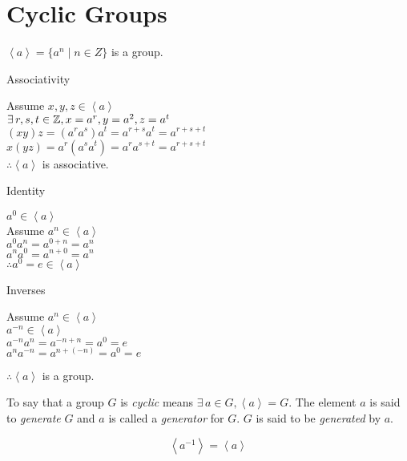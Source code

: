 \documentclass[letterpaper,12pt,fleqn]{article}
\newcommand{\cycle}[1]{\left<#1\right>}
\begin{document}
\section*{Cyclic Groups}

\begin{theorem}
$\cycle{a}=\{a^n\mid n\in Z\}$ is a group.
\end{theorem}

\begin{theproof}
  \listbreak
  \begin{description}
  \item{Associativity}

    Assume $x,y,z\in\cycle{a}$ \\
    $\exists\,r,s,t\in\mathbb{Z},x=a^r,y=a^2,z=a^t$ \\
    $(xy)z=(a^ra^s)a^t=a^{r+s}a^t=a^{r+s+t}$ \\
    $x(yz)=a^r(a^sa^t)=a^ra^{s+t}=a^{r+s+t}$ \\
    $\therefore\cycle{a}$ is associative.

  \item{Identity}

    $a^0\in\cycle{a}$ \\
    Assume $a^n\in\cycle{a}$ \\
    $a^0a^n=a^{0+n}=a^n$ \\
    $a^na^0=a^{n+0}=a^n$ \\
    $\therefore a^0=e\in\cycle{a}$

  \item{Inverses}
    
    Assume $a^n\in\cycle{a}$ \\
    $a^{-n}\in\cycle{a}$ \\
    $a^{-n}a^n=a^{-n+n}=a^0=e$ \\
    $a^na^{-n}=a^{n+(-n)}=a^0=e$
  \end{description}
  $\therefore\cycle{a}$ is a group.
\end{theproof}

\begin{definition}
  To say that a group $G$ is \emph{cyclic} means $\exists\,a\in G,\cycle{a}=G$.
  The element $a$ is said to \emph{generate} $G$ and $a$ is called a
  \emph{generator} for $G$. $G$ is said to be \emph{generated} by $a$.
\end{definition}

\begin{theorem}
  \listbreak
  \[\cycle{a^{-1}}=\cycle{a}\]
\end{theorem}
\end{document}

